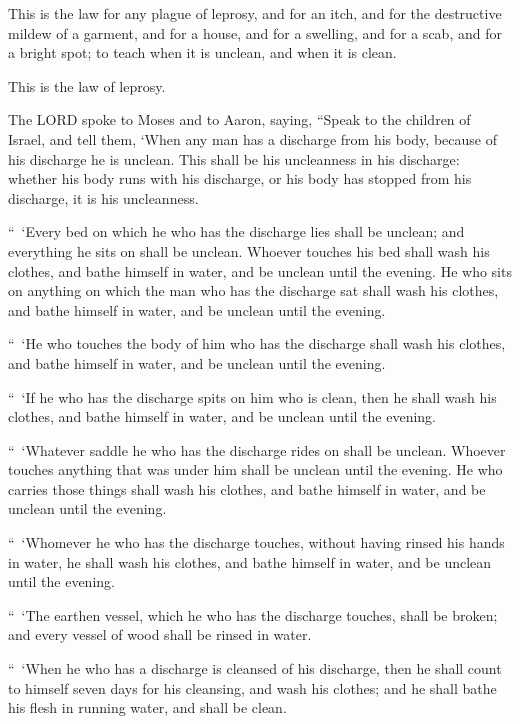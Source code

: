\myverse{}This is the law for any plague of leprosy, and for an itch,
\myverse{}and for the destructive mildew of a garment, and for a house,
\myverse{}and for a swelling, and for a scab, and for a bright spot;
\myverse{}to teach when it is unclean, and when it is clean.

This is the law of leprosy.


\mychapter{} \myverse*{}The LORD spoke to Moses and to Aaron, saying,
\myverse{}“Speak to the children of Israel, and tell them, ‘When any man has a discharge
from his body, because of his discharge he is unclean.
\myverse{}This shall be his uncleanness in his discharge: whether his body runs with
his discharge, or his body has stopped from his discharge, it is his uncleanness.


\myverse{}“ ‘Every bed on which he who has the discharge lies shall be unclean;
and everything he sits on shall be unclean.
\myverse{}Whoever touches his bed shall wash his clothes, and bathe himself in water,
and be unclean until the evening.
\myverse{}He who sits on anything on which the man who has the discharge sat shall wash
his clothes, and bathe himself in water, and be unclean until the evening.


\myverse{}“ ‘He who touches the body of him who has the discharge shall wash
his clothes, and bathe himself in water, and be unclean until the evening.


\myverse{}“ ‘If he who has the discharge spits on him who is clean, then
he shall wash his clothes, and bathe himself in water, and be unclean until the evening.


\myverse{}“ ‘Whatever saddle he who has the discharge rides on shall be unclean.
\myverse{}Whoever touches anything that was under him shall be unclean until the evening.
He who carries those things shall wash his clothes, and bathe himself in water, and be unclean until the
evening.


\myverse{}“ ‘Whomever he who has the discharge touches, without having
rinsed his hands in water, he shall wash his clothes, and bathe himself in water, and be unclean until
the evening.


\myverse{}“ ‘The earthen vessel, which he who has the discharge touches,
shall be broken; and every vessel of wood shall be rinsed in water.


\myverse{}“ ‘When he who has a discharge is cleansed of his discharge,
then he shall count to himself seven days for his cleansing, and wash his clothes; and he shall bathe
his flesh in running water, and shall be clean.


